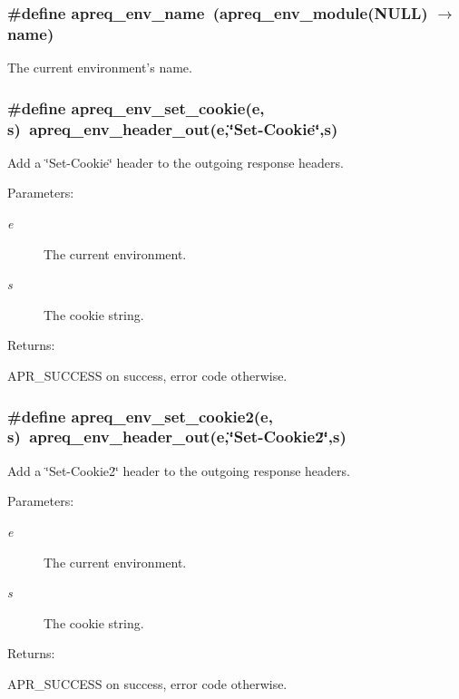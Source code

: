 \subsubsection{\setlength{\rightskip}{0pt plus 5cm}\#define apreq\_\-env\_\-name\ (apreq\_\-env\_\-module(NULL) $\rightarrow$ name)}\label{group__ENV_a19}


The current environment's name. 
\subsubsection{\setlength{\rightskip}{0pt plus 5cm}\#define apreq\_\-env\_\-set\_\-cookie(e, s)\ apreq\_\-env\_\-header\_\-out(e,\char`\"{}Set-Cookie\char`\"{},s)}\label{group__ENV_a16}


Add a \char`\"{}Set-Cookie\char`\"{} header to the outgoing response headers. \begin{Desc}
\item[Parameters: ]\par
\begin{description}
\item[{\em 
e}]The current environment. \item[{\em 
s}]The cookie string. \end{description}
\end{Desc}
\begin{Desc}
\item[Returns: ]\par
APR\_\-SUCCESS on success, error code otherwise. \end{Desc}
\subsubsection{\setlength{\rightskip}{0pt plus 5cm}\#define apreq\_\-env\_\-set\_\-cookie2(e, s)\ apreq\_\-env\_\-header\_\-out(e,\char`\"{}Set-Cookie2\char`\"{},s)}\label{group__ENV_a17}


Add a \char`\"{}Set-Cookie2\char`\"{} header to the outgoing response headers. \begin{Desc}
\item[Parameters: ]\par
\begin{description}
\item[{\em 
e}]The current environment. \item[{\em 
s}]The cookie string. \end{description}
\end{Desc}
\begin{Desc}
\item[Returns: ]\par
APR\_\-SUCCESS on success, error code otherwise. \end{Desc}


